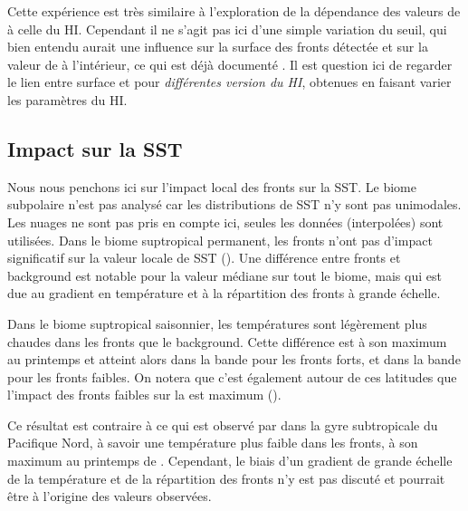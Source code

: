 \begin{note}
  Cette expérience est très similaire à l'exploration de la dépendance des valeurs de  à celle du HI.
  Cependant il ne s'agit pas ici d'une simple variation du seuil, qui bien entendu aurait une influence sur la surface des fronts détectée et sur la valeur de  à l'intérieur, ce qui est déjà documenté .
  Il est question ici de regarder le lien entre surface et  pour \emph{différentes version du HI}, obtenues en faisant varier les paramètres du HI.
\end{note}

\subsection{Impact sur la SST}
\label{sec:res-sst}

Nous nous penchons ici sur l'impact local des fronts sur la SST.
Le biome subpolaire n'est pas analysé car les distributions de SST n'y sont pas unimodales.
Les nuages ne sont pas pris en compte ici, seules les données  (interpolées) sont utilisées.
Dans le biome suptropical permanent, les fronts n'ont pas d'impact significatif sur la valeur locale de SST ().
Une différence entre fronts et background est notable pour la valeur médiane sur tout le biome, mais qui est due au gradient en température et à la répartition des fronts à grande échelle.

\begin{figure}
  \centering
  \label{fig:ts-cli-sst}
\end{figure}

Dans le biome suptropical saisonnier, les températures sont légèrement plus chaudes dans les fronts que le background.
Cette différence est à son maximum au printemps et atteint alors  dans la bande  pour les fronts forts, et  dans la bande  pour les fronts faibles.
On notera que c'est également autour de ces latitudes que l'impact des fronts faibles sur la  est maximum ().

Ce résultat est contraire à ce qui est observé par \textcite{liu_2016} dans la gyre subtropicale du Pacifique Nord, à savoir une température plus faible dans les fronts, à son maximum au printemps de .
Cependant, le biais d'un gradient de grande échelle de la température et de la répartition des fronts n'y est pas discuté et pourrait être à l'origine des valeurs observées.
